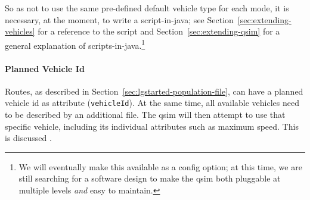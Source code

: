 So as not to use the same pre-defined default vehicle type for each mode, it is necessary, at the moment, to write a script-in-\gls{java}; see  Section~\ref{sec:extending-vehicles} for a reference to the script and Section~\ref{sec:extending-qsim} for a general explanation of scripts-in-\gls{java}.\footnote{We will eventually make this available as a config option; at this time, we are still searching for a software design to make the \gls{qsim} both pluggable at multiple levels \emph{and} easy to maintain.}


\paragraph{Planned Vehicle Id}
Routes, as described in Section~\ref{sec:lgstarted-population-file}, can have a planned vehicle \gls{id} as attribute (\lstinline|vehicleId|).  
At the same time, all available vehicles need to be described by an additional file. 
The \gls{qsim} will then attempt to use that specific vehicle, including its individual attributes such as maximum speed.  
This is discussed .


